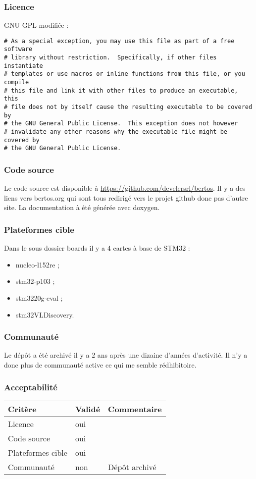 \subsubsection{Licence}
GNU GPL modifiée :
\begin{verbatim}
# As a special exception, you may use this file as part of a free software
# library without restriction.  Specifically, if other files instantiate
# templates or use macros or inline functions from this file, or you compile
# this file and link it with other files to produce an executable, this
# file does not by itself cause the resulting executable to be covered by
# the GNU General Public License.  This exception does not however
# invalidate any other reasons why the executable file might be covered by
# the GNU General Public License.
\end{verbatim}

\subsubsection{Code source}
Le code source est disponible à \url{https://github.com/develersrl/bertos}. Il y a
des liens vers bertos.org qui sont tous redirigé vers le projet github donc pas
d'autre site. La documentation à été générée avec doxygen.

\subsubsection{Plateformes cible}
Dans le sous dossier boards il y a 4 cartes à base de STM32 :
\begin{itemize}
	\item nucleo-l152re ;
	\item stm32-p103 ;
	\item stm3220g-eval ;
	\item stm32VLDiscovery.
\end{itemize}

\subsubsection{Communauté}
Le dépôt a été archivé il y a 2 ans après une dizaine d'années d'activité. Il n'y a
donc plus de communauté active ce qui me semble rédhibitoire.

\subsubsection{Acceptabilité}
\begin{tabular}{lll}
\toprule
	Critère				&	Validé		&	Commentaire	\\
\midrule
	Licence				&	oui			&		\\
	Code source			&	oui			&		\\
	Plateformes cible	&	oui			&		\\
	Communauté			&	non			&	Dépôt archivé	\\
\bottomrule
\end{tabular}
